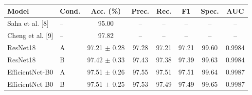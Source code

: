 \begin{tabular}{llcccccc}
\hline
Model & Cond. & Acc. (\%) & Prec. & Rec. & F1 & Spec. & AUC \\
\hline
Saha et al. [8] & -- & 95.00 & -- & -- & -- & -- & -- \\
Cheng et al. [9] & -- & 97.82 & -- & -- & -- & -- & -- \\
ResNet18 & A & 97.21 $\pm$ 0.28 & 97.28 & 97.21 & 97.21 & 99.60 & 0.9984 \\
ResNet18 & B & 97.42 $\pm$ 0.33 & 97.43 & 97.38 & 97.39 & 99.63 & 0.9984 \\
EfficientNet-B0 & A & 97.51 $\pm$ 0.26 & 97.55 & 97.51 & 97.51 & 99.64 & 0.9987 \\
EfficientNet-B0 & B & 97.51 $\pm$ 0.25 & 97.53 & 97.49 & 97.49 & 99.65 & 0.9987 \\
\hline
\end{tabular}